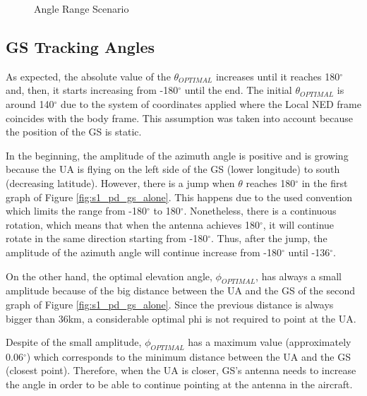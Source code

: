 \begin{figure}[H]
	\caption{Angle Range Scenario}
	\label{fig:s1_map}
\end{figure}

\subsection*{GS Tracking Angles}\label{GroundStation_scenario1}
As expected, the absolute value of the $\theta_{OPTIMAL}$ increases until it reaches 180$^{\circ}$  and, then, it starts increasing from -180$^{\circ}$ until the end. The initial $\theta_{OPTIMAL}$ is around 140$^{\circ}$ due to the system of coordinates applied where the Local NED frame coincides with the body frame. This assumption was taken into account because the position of the GS is static.

In the beginning, the amplitude of the azimuth angle is positive and is growing because the UA is flying on the left side of the GS (lower longitude) to south (decreasing latitude). However, there is a jump when $\theta$ reaches 180$^{\circ}$ in the first graph of Figure \ref{fig:s1_pd_gs_alone}. This happens due to the used convention which limits the range from -180$^{\circ}$ to 180$^{\circ}$. Nonetheless, there is a continuous rotation, which means that when the antenna achieves 180$^{\circ}$, it will continue rotate in the same direction starting from -180$^{\circ}$. Thus, after the jump, the amplitude of the azimuth angle will continue increase from -180$^{\circ}$ until -136$^{\circ}$.

On the other hand, the optimal elevation angle, $\phi_{OPTIMAL}$, has always a small amplitude because of the big distance between the UA and the GS of the second graph of Figure \ref{fig:s1_pd_gs_alone}. Since the previous distance is always bigger than 36km, a considerable optimal phi is not required to point at the UA. 

Despite of the small amplitude, $\phi_{OPTIMAL}$ has a maximum value (approximately 0.06$^{\circ}$) which corresponds to the minimum distance between the UA and the GS (closest point). Therefore, when the UA is closer, GS’s antenna needs to increase the angle in order to be able to continue pointing at the antenna in the aircraft.

